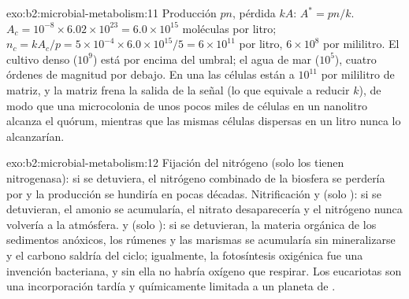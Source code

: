 \begin{solution}{exo:b2:microbial-metabolism:11}
Producción $pn$, pérdida $kA$: $A^* = pn/k$. $A_c = 10^{-8}\times
6.02\times 10^{23} = 6.0\times 10^{15}$ moléculas por litro; $n_c =
kA_c/p = 5\times 10^{-4}\times 6.0\times 10^{15}/5 = 6\times 10^{11}$
por litro, $6\times 10^{8}$ por mililitro. El cultivo denso
($10^{9}$) está por encima del umbral; el agua de mar ($10^{5}$), cuatro
órdenes de magnitud por debajo. En una  las células están a
$10^{11}$ por mililitro de matriz, y la matriz frena la salida de la
señal (lo que equivale a reducir $k$), de modo que una microcolonia de
unos pocos miles de células en un nanolitro alcanza el quórum, mientras
que las mismas células dispersas en un litro nunca lo alcanzarían.
\end{solution}

\begin{solution}{exo:b2:microbial-metabolism:12}
Fijación del nitrógeno (solo los  tienen nitrogenasa): si se
detuviera, el nitrógeno combinado de la biosfera se perdería por
 y la producción se hundiría en pocas décadas.
Nitrificación y  (solo ): si se detuvieran,
el amonio se acumularía, el nitrato desaparecería y el nitrógeno nunca
volvería a la atmósfera.  y  (solo
): si se detuvieran, la materia orgánica de los sedimentos
anóxicos, los rúmenes y las marismas se acumularía sin mineralizarse y
el carbono saldría del ciclo; igualmente, la fotosíntesis oxigénica fue
una invención bacteriana, y sin ella no habría oxígeno que respirar.
Los eucariotas son una incorporación tardía y químicamente limitada a un
planeta de .
\end{solution}

